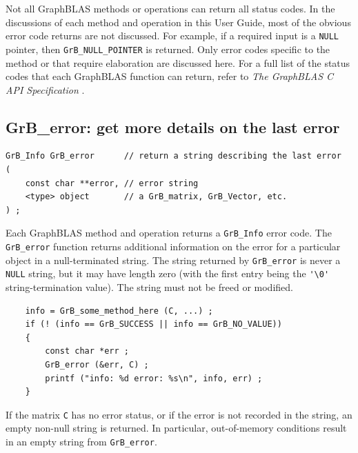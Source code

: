 Not all GraphBLAS methods or operations can return all status codes.
In the discussions of each method and operation in this User Guide, most of the
obvious error code returns are not discussed.  For example, if a required input
is a \verb'NULL' pointer, then \verb'GrB_NULL_POINTER' is returned.  Only error
codes specific to the method or that require elaboration are discussed here.
For a full list of the status codes that each GraphBLAS function can return,
refer to {\em The GraphBLAS C API Specification} \cite{spec,spec2}.

\subsection{{\sf GrB\_error:} get more details on the last error} %
\label{error}

\begin{mdframed}[userdefinedwidth=6in]
{\footnotesize
\begin{verbatim}
GrB_Info GrB_error      // return a string describing the last error
(
    const char **error, // error string
    <type> object       // a GrB_matrix, GrB_Vector, etc.
) ;
\end{verbatim}
}\end{mdframed}

Each GraphBLAS method and operation returns a \verb'GrB_Info' error code.  The
\verb'GrB_error' function returns additional information on the error for a
particular object in a null-terminated string.  The string returned by
\verb'GrB_error' is never a \verb'NULL' string, but it may have length zero
(with the first entry being the \verb"'\0'" string-termination value).  The
string must not be freed or modified.

    {\footnotesize
    \begin{verbatim}
    info = GrB_some_method_here (C, ...) ;
    if (! (info == GrB_SUCCESS || info == GrB_NO_VALUE))
    {
        const char *err ;
        GrB_error (&err, C) ;
        printf ("info: %d error: %s\n", info, err) ;
    } \end{verbatim}}

If the matrix \verb'C' has no error status, or if the error is not recorded in
the string, an empty non-null string is returned.  In particular, out-of-memory
conditions result in an empty string from \verb'GrB_error'.

